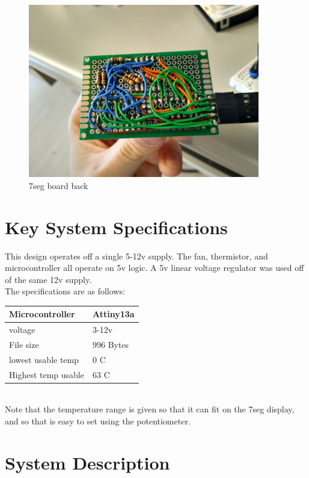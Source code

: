\documentclass{hitec}
\begin{document}
\begin{figure}[H]
\centering
\includegraphics[width=0.9\textwidth]{boardphoto3.jpg}
\caption{7seg board back}
\label{fig:boardphoto2}
\end{figure}

\section{Key System Specifications}


This design operates off a single 5-12v supply. The fan, thermistor, and microcontroller all operate on 5v logic. A 5v linear voltage regulator was used off of the same 12v supply. 
\\
The specifications are as follows:\\
\begin{tabular}{|l||l|}
\hline	

Microcontroller            & Attiny13a \\ \hline
voltage                    & 3-12v       \\ \hline
File size					& 996 Bytes		\\ \hline
lowest usable temp			& 0 C			\\	\hline
Highest temp usable			& 63 C			\\	\hline
\end{tabular}
\\
Note that the temperature range is given so that it can fit on the 7seg display, and so that is easy to set using the potentiometer.

\section{System Description}
\end{document}
